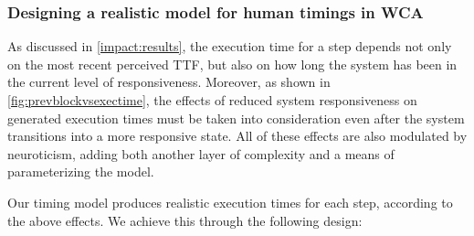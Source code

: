 \subsubsection{Designing a realistic model for human timings in \gls{WCA}}

As discussed in \cref{impact:results}, the execution time for a step depends not only on the most recent perceived \gls{TTF}, but also on how long the system has been in the current level of responsiveness.
Moreover, as shown in \cref{fig:prevblockvsexectime}, the effects of reduced system responsiveness on generated execution times must be taken into consideration even after the system transitions into a more responsive state.
All of these effects are also modulated by neuroticism, adding both another layer of complexity and a means of parameterizing the model.

Our timing model produces realistic execution times for each step, according to the above effects.
We achieve this through the following design:

